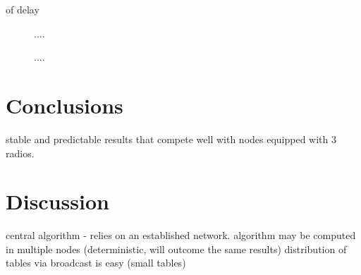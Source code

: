 \documentclass[12pt]{article}
\newenvironment{proof sketch}[1]{\noindent {\emph{Proof sketch of #1:}}}{\hfill \qed}
\begin{document}
of delay





\begin{figure}%
      \centering
       \caption{....}
      \label{fig:big6}\label{fig:scenario grid}
     \end{figure}

\begin{figure}%
      \centering
        \caption{....}
      \label{fig:big5}\label{fig:scenario circle}
     \end{figure}


\section{Conclusions}
stable and predictable results that compete well with nodes equipped with $3$ radios.



\section{Discussion}
central algorithm - relies on an established network.
algorithm may be computed in multiple nodes (deterministic, will outcome the same results)
distribution of tables via broadcast is easy (small tables)
\end{document}

